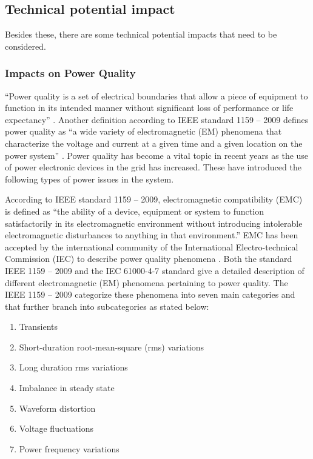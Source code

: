 \subsection{Technical potential impact}
Besides these, there are some technical potential impacts that need to be considered.

\subsubsection{Impacts on Power Quality}
“Power quality is a set of electrical boundaries that allow a piece of equipment to function in its intended manner without significant loss of performance or life expectancy” \cite{TPI1}. Another definition according to IEEE standard 1159 – 2009 defines power quality as “a wide variety of electromagnetic (EM) phenomena that characterize the voltage and current at a given time and a given location on the power system” \cite{TPI2}.  Power quality has become a vital topic in recent years as the use of power electronic devices in the grid has increased. These have introduced the following types of power issues in the system.

According to IEEE standard 1159 – 2009, electromagnetic compatibility (EMC) is defined as “the ability of a device, equipment or system to function satisfactorily in its electromagnetic environment without introducing intolerable electromagnetic disturbances to anything in that environment.”  EMC has been accepted by the international community of the International Electro-technical Commission (IEC) to describe power quality phenomena \cite{TPI2}. Both the standard IEEE 1159 – 2009 and the IEC 61000-4-7 standard give a detailed description of different electromagnetic (EM) phenomena pertaining to power quality. The IEEE 1159 – 2009 categorize these phenomena into seven main categories and that further branch into subcategories as stated below:
\begin{enumerate}
    \item Transients
    \item Short-duration root-mean-square (rms) variations
    \item Long duration rms variations
    \item Imbalance in steady state
    \item Waveform distortion
    \item Voltage fluctuations 
    \item Power frequency variations
\end{enumerate}

